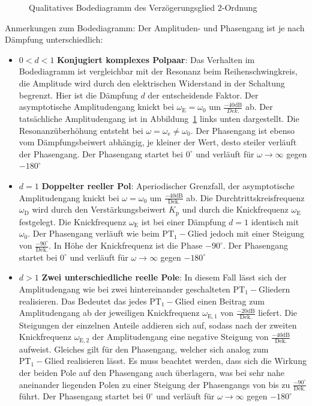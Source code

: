 \begin{itemize}
\begin{figure}[h]
		\caption{Qualitatives Bodediagramm des Verzögerungsglied 2-Ordnung}
		\label{fig:pt2gliedbode}
	\end{figure}
	Anmerkungen zum Bodediagramm: Der Amplituden- und Phasengang ist je nach Dämpfung unterschiedlich:
	\begin{itemize}
		\item $0<d<1$ \textbf{Konjugiert komplexes Polpaar}: Das Verhalten im Bodediagramm ist vergleichbar mit der Resonanz beim Reihenschwingkreis, die Amplitude wird durch den elektrischen Widerstand in der Schaltung begrenzt. Hier ist die Dämpfung $d$ der entscheidende Faktor. Der asymptotische Amplitudengang knickt bei $\omega_{\text{E}}=\omega_{0}$ um $\frac{-40\text{dB}}{Dek.}$ ab. Der tatsächliche Amplitudengang ist in Abbildung~\ref{fig:pt2gliedbode} links unten dargestellt. Die Resonanzüberhöhung entsteht bei $\omega=\omega_{\text{e}}\neq\omega_{0}$. Der Phasengang ist ebenso vom Dämpfungsbeiwert abhängig, je kleiner der Wert, desto steiler verläuft der Phasengang. Der Phasengang startet bei $0^{\circ}$ und verläuft für $\omega\rightarrow \infty$ gegen $-180^{\circ}$
		\item $d=1$ \textbf{Doppelter reeller Pol}: Aperiodischer Grenzfall, der asymptotische Amplitudengang knickt bei $\omega=\omega_{0}$ um $\frac{-40\text{dB}}{\text{Dek.}}$ ab. Die Durchtrittskreisfrequenz $\omega_{\text{D}}$ wird durch den Verstärkungsbeiwert $K_{\text{p}}$ und durch die Knickfrequenz $\omega_{\text{E}}$ festgelegt. Die Knickfrequenz $\omega_{\text{E}}$ ist bei einer Dämpfung $d=1$ identisch mit $\omega_{0}$. Der Phasengang verläuft wie beim $\text{PT}_{1}-\text{Glied}$ jedoch mit einer Steigung von $\frac{-90^{\circ}}{\text{Dek.}}$. In Höhe der Knickfrequenz ist die Phase $-90^{\circ}$. Der Phasengang startet bei $0^{\circ}$ und verläuft für $\omega\rightarrow \infty$ gegen $-180^{\circ}$
		\item $d>1$ \textbf{Zwei unterschiedliche reelle Pole}: In diesem Fall lässt sich der Amplitudengang wie bei zwei hintereinander geschalteten  $\text{PT}_{1}-\text{Gliedern}$ realisieren. Das Bedeutet das jedes  $\text{PT}_{1}-\text{Glied}$ einen Beitrag zum Amplitudengang ab der jeweiligen Knickfrequenz $\omega_{\text{E},1}$ von $\frac{-20\text{dB}}{\text{Dek.}}$ liefert. Die Steigungen der einzelnen Anteile addieren sich auf, sodass nach der zweiten Knickfrequenz $\omega_{\text{E},2}$ der Amplitudengang eine negative Steigung von $\frac{-40\text{dB}}{\text{Dek.}}$ aufweist. Gleiches gilt für den Phasengang, welcher sich analog zum $\text{PT}_{1}-\text{Glied}$ realisieren lässt. Es muss beachtet werden, dass sich die Wirkung der beiden Pole auf den Phasengang auch überlagern, was bei sehr nahe aneinander liegenden Polen zu einer Steigung der Phasengangs von bis zu $\frac{-90^{\circ}}{\text{Dek.}}$ führt. Der Phasengang startet bei $0^{\circ}$ und verläuft für $\omega\rightarrow \infty$ gegen $-180^{\circ}$

\end{itemize}
\end{itemize}
